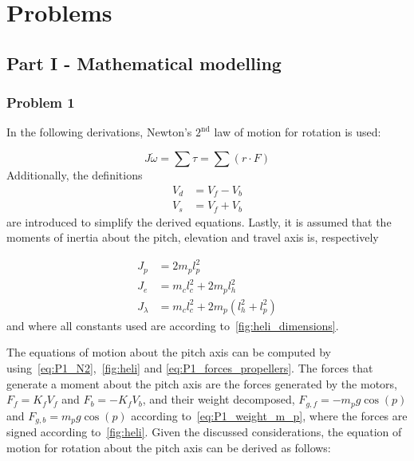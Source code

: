\section{Problems}\label{sec:figures}
\subsection{Part I - Mathematical modelling}\label{subsec:part1}
\subsubsection{Problem 1}

In the following derivations, Newton's $2^{\text{nd}}$ law of motion for rotation is used:

\begin{equation}\label{eq:P1_N2}
    J \dot{\omega} = \sum \tau = \sum \left(r\cdot F\right)
\end{equation}
Additionally, the definitions
\begin{subequations}\label{eq:P1_Vd_Vs_definitions}
    \begin{align}
        V_d &= V_f - V_b\label{eq:P1_Vd_definition} \\
        V_s &= V_f + V_b\label{eq:P1_Vs_definition}
    \end{align}    
\end{subequations}
are introduced to simplify the derived equations. Lastly, it is assumed that the moments of inertia about the pitch, elevation and travel axis is, respectively

\begin{subequations}\label{eq:P1_moments_of_inertia}
    \begin{align}
        J_p &= 2m_pl_p^2 \label{eq:P1_moment_of_inertia_p} \\
        J_e &= m_cl_c^2 + 2m_pl_h^2 \label{eq:P1_moment_of_inertia_e} \\
        J_{\lambda} &= m_cl_c^2 + 2m_p(l_h^2 + l_p^2) \label{eq:P1_moment_of_inertia_lambda}
    \end{align}
\end{subequations}
and where all constants used are according to~\cref{fig:heli_dimensions}.

The equations of motion about the pitch axis can be computed by using~\cref{eq:P1_N2},~\cref{fig:heli} and \cref{eq:P1_forces_propellers}. The forces that generate a moment about the pitch axis are the forces generated by the motors, $F_f = K_f V_f$ and $F_b = -K_f V_b$, and their weight decomposed, $F_{g,f}=-m_pg\cos(p)$ and $F_{g,b}=m_pg\cos(p)$ according to~\cref{eq:P1_weight_m_p}, where the forces are signed according to~\cref{fig:heli}. Given the discussed considerations, the equation of motion for rotation about the pitch axis can be derived as follows:

